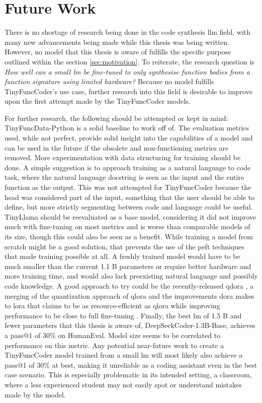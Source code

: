 \section{Future Work}
\label{sec:future}
There is no shortage of research being done in the code synthesis \ac{llm} field, with many new advancements being made while this thesis was being written.
However, no model that this thesis is aware of fulfills the specific purpose outlined within the section \ref{sec:motivation}.
To reiterate, the research question is \emph{How well can a small \acl{lm} be fine-tuned to only synthesise function bodies from a function signature using limited hardware?}
Because no model fulfills TinyFuncCoder's use case, further research into this field is desirable to improve upon the first attempt made by the TinyFuncCoder models.

For further research, the following should be attempted or kept in mind:
TinyFuncData-Python is a solid baseline to work off of.
The evaluation metrics used, while not perfect, provide solid insight into the capabilities of a model and can be used in the future if the obsolete and non-functioning metrics are removed.
More experimentation with data structuring for training should be done.
A simple suggestion is to approach training as a natural language to code task, where the natural language docstring is seen as the input and the entire function as the output.
This was not attempted for TinyFuncCoder because the head was considered part of the input, something that the user should be able to define, but more strictly segmenting between code and language could be useful.
TinyLlama should be reevaluated as a base model, considering it did not improve much with fine-tuning on most metrics and is worse than comparable models of its size, though this could also be seen as a benefit.
While training a model from scratch might be a good solution, that prevents the use of the \ac{peft} techniques that made training possible at all.
A freshly trained model would have to be much smaller than the current 1.1 B parameters or require better hardware and more training time, and would also lack preexisting natural language and possibly code knowledge.
A good approach to try could be the recently-released \ac{qdora} \cite{Liu.2024b}, a merging of the quantization approach of \ac{qlora} and the improvements \ac{dora} \cite{Liu.2024b} makes to \ac{lora} that claims to be as resource-efficient as \ac{qlora} while improving performance to be close to full fine-tuning \cite{Liu.2024b}.
Finally, the best \ac{lm} of 1.5 B and fewer parameters that this thesis is aware of, DeepSeekCoder-1.3B-Base, achieves a pass@1 of 30\% on HumanEval.
Model size seems to be correlated to performance on this metric.
Any potential near-future work to create a TinyFuncCoder model trained from a small \ac{lm} will most likely also achieve a pass@1 of 30\% at best, making it unreliable as a coding assistant even in the best case scenario.
This is especially problematic in its intended setting, a classroom, where a less experienced student may not easily spot or understand mistakes made by the model.